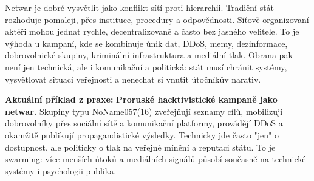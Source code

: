 \documentclass[11pt,a4paper]{article}
\newcommand{\aktualni}[1]{\begin{tcolorbox}[breakable,enhanced,colback=green!10,colframe=green!35!black,boxrule=0pt,arc=1mm,left=5pt,right=5pt,top=5pt,bottom=5pt,before skip=6pt,after skip=6pt]\textbf{Aktuální příklad z praxe:} #1\end{tcolorbox}}
\begin{document}
Netwar je dobré vysvětlit jako konflikt sítí proti hierarchii. Tradiční stát rozhoduje pomaleji, přes instituce, procedury a odpovědnosti. Síťově organizovaní aktéři mohou jednat rychle, decentralizovaně a často bez jasného velitele. To je výhoda u kampaní, kde se kombinuje únik dat, DDoS, memy, dezinformace, dobrovolnické skupiny, kriminální infrastruktura a mediální tlak. Obrana pak není jen technická, ale i komunikační a politická: stát musí chránit systémy, vysvětlovat situaci veřejnosti a nenechat si vnutit útočníkův narativ.

\aktualni{\textbf{Proruské hacktivistické kampaně jako netwar.} Skupiny typu NoName057(16) zveřejňují seznamy cílů, mobilizují dobrovolníky přes sociální sítě a komunikační platformy, provádějí DDoS a okamžitě publikují propagandistické výsledky. Technicky jde často "jen" o dostupnost, ale politicky o tlak na veřejné mínění a reputaci státu. To je swarming: více menších útoků a mediálních signálů působí současně na technické systémy i psychologii publika.}
\end{document}

